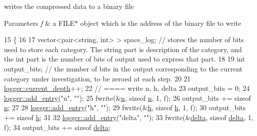 writes the compressed data to a binary file 


\begin{DoxyParams}{Parameters}
{\em f} & a {\ttfamily F\+I\+L\+E$\ast$} object which is the address of the binary file to write \\
\hline
\end{DoxyParams}

\begin{DoxyCode}
15                                                  \{
16 
17   vector<pair<string, int> > space\_log; \textcolor{comment}{// stores the number of bits used to store each category. The
       string part is description of the category, and the int part is the number of bits of output used to express that
       part.}
18 
19   \textcolor{keywordtype}{int} output\_bits; \textcolor{comment}{// the number of bits in the output corresponding to the current category under
       investigation, to be zeroed at each step.}
20 
21   \hyperlink{classlogger_a9d29b49bd318a719a8e85b59eac54fe0}{logger::current\_depth}++;
22   \textcolor{comment}{// ==== write n, h, delta}
23   output\_bits = 0;
24   \hyperlink{classlogger_a710163deb17bc81f70d53d285b8ac9ac}{logger::add\_entry}(\textcolor{stringliteral}{"n"}, \textcolor{stringliteral}{""});
25   fwrite(&\hyperlink{classmarked__graph__compressed_a8d841016ddb11cfd33748c8deb6277ba}{n}, \textcolor{keyword}{sizeof} \hyperlink{classmarked__graph__compressed_a8d841016ddb11cfd33748c8deb6277ba}{n}, 1, f);
26   output\_bits += \textcolor{keyword}{sizeof} \hyperlink{classmarked__graph__compressed_a8d841016ddb11cfd33748c8deb6277ba}{n};
27 
28   \hyperlink{classlogger_a710163deb17bc81f70d53d285b8ac9ac}{logger::add\_entry}(\textcolor{stringliteral}{"h"}, \textcolor{stringliteral}{""});
29   fwrite(&\hyperlink{classmarked__graph__compressed_af6ff623407b673d08d0cab77b39c2193}{h}, \textcolor{keyword}{sizeof} \hyperlink{classmarked__graph__compressed_af6ff623407b673d08d0cab77b39c2193}{h}, 1, f);
30   output\_bits += \textcolor{keyword}{sizeof} \hyperlink{classmarked__graph__compressed_af6ff623407b673d08d0cab77b39c2193}{h};
31 
32   \hyperlink{classlogger_a710163deb17bc81f70d53d285b8ac9ac}{logger::add\_entry}(\textcolor{stringliteral}{"delta"}, \textcolor{stringliteral}{""});
33   fwrite(&\hyperlink{classmarked__graph__compressed_a8b2aaac68e9332ddc78d88eb60b323a7}{delta}, \textcolor{keyword}{sizeof} \hyperlink{classmarked__graph__compressed_a8b2aaac68e9332ddc78d88eb60b323a7}{delta}, 1, f);
34   output\_bits += \textcolor{keyword}{sizeof} \hyperlink{classmarked__graph__compressed_a8b2aaac68e9332ddc78d88eb60b323a7}{delta};

\end{DoxyCode}
